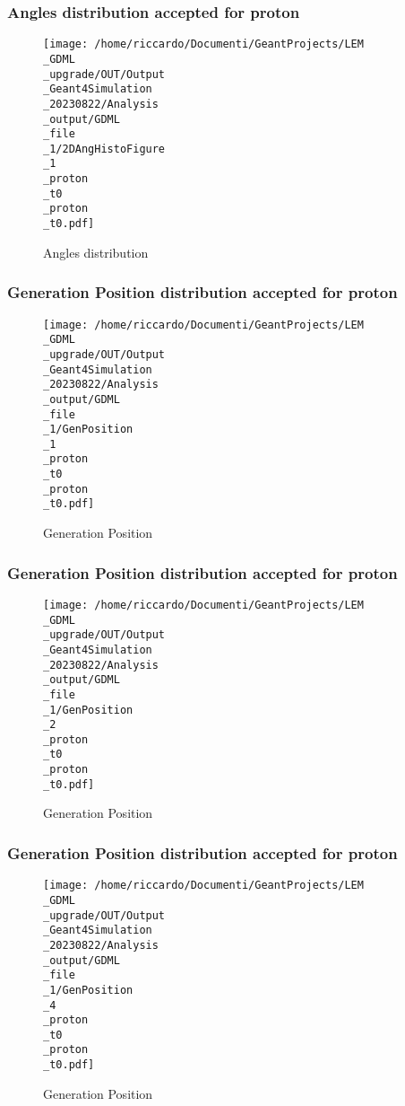 \documentclass[8pt]{beamer}
\begin{document}
            \begin{frame}
                \frametitle{Angles distribution accepted for proton}
            
        \begin{figure}[h]
            \centering
            \texttt{[image: /home/riccardo/Documenti/GeantProjects/LEM\\\_GDML\\\_upgrade/OUT/Output\\\_Geant4Simulation\\\_20230822/Analysis\\\_output/GDML\\\_file\\\_1/2DAngHistoFigure\\\_1\\\_proton\\\_t0\\\_proton\\\_t0.pdf]}
            \caption{Angles distribution}
        \end{figure}
        
            \end{frame}
            
            \begin{frame}
                \frametitle{Generation Position distribution accepted for proton}
            
        \begin{figure}[h]
            \centering
            \texttt{[image: /home/riccardo/Documenti/GeantProjects/LEM\\\_GDML\\\_upgrade/OUT/Output\\\_Geant4Simulation\\\_20230822/Analysis\\\_output/GDML\\\_file\\\_1/GenPosition\\\_1\\\_proton\\\_t0\\\_proton\\\_t0.pdf]}
            \caption{Generation Position}
        \end{figure}
        
            \end{frame}
            
            \begin{frame}
                \frametitle{Generation Position distribution accepted for proton}
            
        \begin{figure}[h]
            \centering
            \texttt{[image: /home/riccardo/Documenti/GeantProjects/LEM\\\_GDML\\\_upgrade/OUT/Output\\\_Geant4Simulation\\\_20230822/Analysis\\\_output/GDML\\\_file\\\_1/GenPosition\\\_2\\\_proton\\\_t0\\\_proton\\\_t0.pdf]}
            \caption{Generation Position}
        \end{figure}
        
            \end{frame}
            
            \begin{frame}
                \frametitle{Generation Position distribution accepted for proton}
            
        \begin{figure}[h]
            \centering
            \texttt{[image: /home/riccardo/Documenti/GeantProjects/LEM\\\_GDML\\\_upgrade/OUT/Output\\\_Geant4Simulation\\\_20230822/Analysis\\\_output/GDML\\\_file\\\_1/GenPosition\\\_4\\\_proton\\\_t0\\\_proton\\\_t0.pdf]}
            \caption{Generation Position}
        \end{figure}
        
            \end{frame}
            
\end{document}
